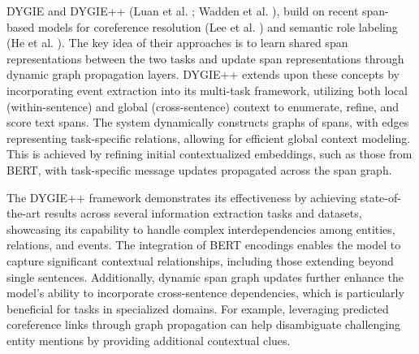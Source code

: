 \ac{DYGIE} and DYGIE++ (Luan et al. \cite{luan-etal-2019-general}; Wadden et al. \cite{Wadden2019EntityRA}), build on recent span-based models for coreference resolution (Lee et al. \cite{lee-etal-2017-end}) and semantic role labeling (He et al. \cite{he-etal-2018-jointly}). The key idea of their approaches is to learn shared span representations between the two tasks and update span representations through dynamic graph propagation layers.  DYGIE++ extends upon these concepts by incorporating event extraction into its multi-task framework, utilizing both local (within-sentence) and global (cross-sentence) context to enumerate, refine, and score text spans. The system dynamically constructs graphs of spans, with edges representing task-specific relations, allowing for efficient global context modeling. This is achieved by refining initial contextualized embeddings, such as those from \ac{BERT}, with task-specific message updates propagated across the span graph.

The DYGIE++ framework demonstrates its effectiveness by achieving state-of-the-art results across several information extraction tasks and datasets, showcasing its capability to handle complex interdependencies among entities, relations, and events. The integration of BERT encodings enables the model to capture significant contextual relationships, including those extending beyond single sentences. Additionally, dynamic span graph updates further enhance the model's ability to incorporate cross-sentence dependencies, which is particularly beneficial for tasks in specialized domains. For example, leveraging predicted coreference links through graph propagation can help disambiguate challenging entity mentions by providing additional contextual clues.

